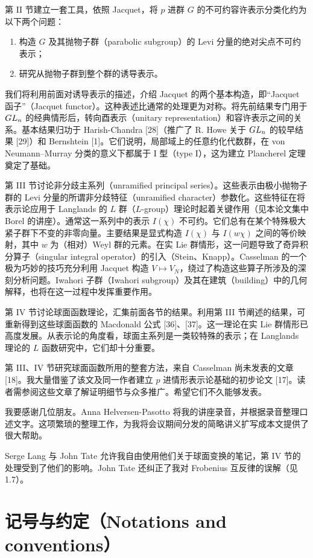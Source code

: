 第 II 节建立一套工具，依照 Jacquet，将 $p$ 进群 $G$ 的不可约容许表示分类化约为以下两个问题：
\begin{enumerate}
\item[(a)] 构造 $G$ 及其抛物子群（parabolic subgroup）的 Levi 分量的绝对尖点不可约表示；
\item[(b)] 研究从抛物子群到整个群的诱导表示。
\end{enumerate}
我们将利用前面对诱导表示的描述，介绍 Jacquet 的两个基本构造，即“Jacquet 函子”（Jacquet functor）。这种表述比通常的处理更为对称。将先前结果专门用于 $GL_n$ 的经典情形后，转向酉表示（unitary representation）和容许表示之间的关系。基本结果归功于 Harish-Chandra [28]（推广了 R. Howe 关于 $GL_n$ 的较早结果 [29]）和 Bernshtein [1]。它们说明，局部域上的任意约化代数群，在 von Neumann--Murray 分类的意义下都属于 I 型（type I），这为建立 Plancherel 定理奠定了基础。

第 III 节讨论非分歧主系列（unramified principal series）。这些表示由极小抛物子群的 Levi 分量的所谓非分歧特征（unramified character）参数化。这些特征在将表示论应用于 Langlands 的 $L$ 群（$L$-group）理论时起着关键作用（见本论文集中 Borel 的讲座）。通常这一系列中的表示 $I(\chi)$ 不可约。它们总有在某个特殊极大紧子群下不变的非零向量。主要结果是显式构造 $I(\chi)$ 与 $I(w\chi)$ 之间的等价映射，其中 $w$ 为（相对）Weyl 群的元素。在实 Lie 群情形，这一问题导致了奇异积分算子（singular integral operator）的引入（Stein、Knapp）。Casselman 的一个极为巧妙的技巧充分利用 Jacquet 构造 $V\mapsto V_N$，绕过了构造这些算子所涉及的深刻分析问题。Iwahori 子群（Iwahori subgroup）及其在建筑（building）中的几何解释，也将在这一过程中发挥重要作用。

第 IV 节讨论球面函数理论，汇集前面各节的结果。利用第 III 节阐述的结果，可重新得到这些球面函数的 Macdonald 公式 [36]、[37]。这一理论在实 Lie 群情形已高度发展。从表示论的角度看，球面主系列是一类较特殊的表示；在 Langlands 理论的 $L$ 函数研究中，它们却十分重要。

第 III、IV 节研究球面函数所用的整套方法，来自 Casselman 尚未发表的文章 [18]。我大量借鉴了该文及同一作者建立 $p$ 进情形表示论基础的初步论文 [17]。读者需参阅这些文章了解证明细节与众多推广。希望它们不久能够发表。

我要感谢几位朋友。Anna Helversen-Pasotto 将我的讲座录音，并根据录音整理口述文字。这项繁琐的整理工作，为我将会议期间分发的简略讲义扩写成本文提供了很大帮助。

Serge Lang 与 John Tate 允许我自由使用他们关于球面变换的笔记，第 IV 节的处理受到了他们的影响。John Tate 还纠正了我对 Frobenius 互反律的误解（见1.7）。
\section*{记号与约定（Notations and conventions）}
